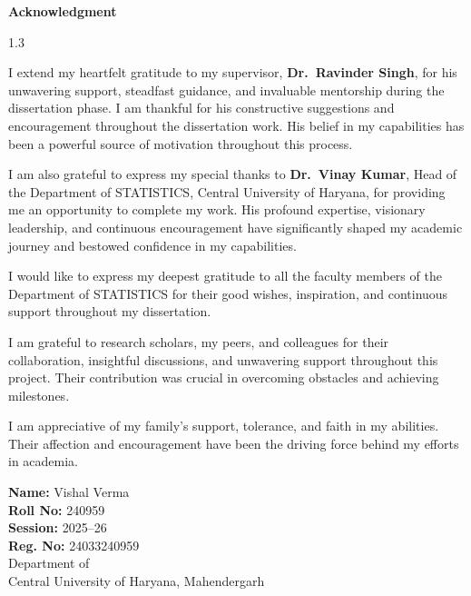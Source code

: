 
\thispagestyle{plain}

\begin{center}
{\fontsize{18}{19}\selectfont \textbf{Acknowledgment}}
\end{center}

\vspace{1.2cm}

\begin{spacing}{1.3}

\noindent
I extend my heartfelt gratitude to my supervisor, \textbf{Dr.\ Ravinder Singh}, for his unwavering support, steadfast guidance, and invaluable mentorship during the dissertation phase. I am thankful for his constructive suggestions and encouragement throughout the dissertation work. His belief in my capabilities has been a powerful source of motivation throughout this process.

\vspace{0.4cm}

\noindent
I am also grateful to express my special thanks to \textbf{Dr.\ Vinay Kumar}, Head of the Department of STATISTICS, Central University of Haryana, for providing me an opportunity to complete my work. His profound expertise, visionary leadership, and continuous encouragement have significantly shaped my academic journey and bestowed confidence in my capabilities.

\vspace{0.4cm}

\noindent
I would like to express my deepest gratitude to all the faculty members of the \\Department of STATISTICS for their good wishes, inspiration, and continuous support throughout my dissertation.

\vspace{0.4cm}

\noindent
I am grateful to research scholars, my peers, and colleagues for their collaboration, insightful discussions, and unwavering support throughout this project. Their contribution was crucial in overcoming obstacles and achieving milestones.

\vspace{0.4cm}

\noindent
I am appreciative of my family's support, tolerance, and faith in my abilities. Their affection and encouragement have been the driving force behind my efforts in academia.

\end{spacing}

\vspace{2cm}

\begin{flushright}
\textbf{Name: } Vishal Verma\\[0.2cm]
\textbf{Roll No:} 240959 \\[0.2cm]
\textbf{Session:} 2025--26 \\[0.2cm]
\textbf{Reg. No:}  24033240959\\[0.2cm]
Department of  \\
Central University of Haryana, Mahendergarh
\end{flushright}

\cleardoublepage
